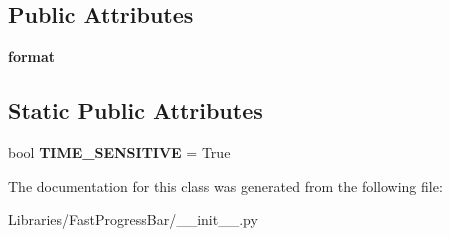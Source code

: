 \subsection*{Public Attributes}
\begin{DoxyCompactItemize}
\item 
{\bfseries format}\hypertarget{class_libraries_1_1_fast_progress_bar_1_1_timer_aa5aa881a02411b2236bf409fecb290cd}{}\label{class_libraries_1_1_fast_progress_bar_1_1_timer_aa5aa881a02411b2236bf409fecb290cd}

\end{DoxyCompactItemize}
\subsection*{Static Public Attributes}
\begin{DoxyCompactItemize}
\item 
bool {\bfseries T\+I\+M\+E\+\_\+\+S\+E\+N\+S\+I\+T\+I\+VE} = True\hypertarget{class_libraries_1_1_fast_progress_bar_1_1_timer_a33daa878003ea7525a5c4406cce58604}{}\label{class_libraries_1_1_fast_progress_bar_1_1_timer_a33daa878003ea7525a5c4406cce58604}

\end{DoxyCompactItemize}


The documentation for this class was generated from the following file\+:\begin{DoxyCompactItemize}
\item 
Libraries/\+Fast\+Progress\+Bar/\+\_\+\+\_\+init\+\_\+\+\_\+.\+py\end{DoxyCompactItemize}
